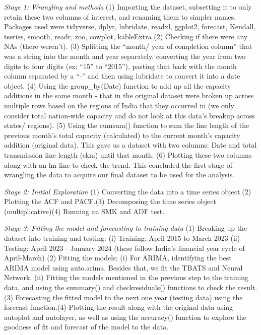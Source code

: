 \documentclass[
]{article}
\begin{document}
\emph{Stage 1: Wrangling and methods} \n (1) Importing the dataset,
subsetting it to only retain these two columns of interest, and renaming
them to simpler names. Packages used were tidyverse, dplyr, lubridate,
readxl, ggplot2, forecast, Kendall, tseries, smooth, readr, zoo,
cowplot, kableExtra \n (2) Checking if there were any NAs (there
weren't). \n (3) Splitting the ``month/ year of completion column'' that
was a string into the month and year separately, converting the year
from two digits to four digits (ex: ``15'' to ``2015''), pasting that
back with the month column separated by a ``-'' and then using lubridate
to convert it into a date object. \n (4) Using the group\_by(Date)
function to add up all the capacity additions in the same month - that
in the original dataset were broken up across multiple rows based on the
regions of India that they occurred in (we only consider total
nation-wide capacity and do not look at this data's breakup across
states/ regions). \n (5) Using the cumsum() function to sum the line
length of the previous month's total capacity (calculated) to the
current month's capacity addition \n (original data). This gave us a
dataset with two columns: Date and total transmission line length (ckm)
until that month. \n (6) Plotting these two columns along with an lm
line to check the trend. \n This concluded the first stage of wrangling
the data to acquire our final dataset to be used for the analysis.

\emph{Stage 2: Initial Exploration} \n (1) Converting the data into a
time series object.\n (2) Plotting the ACF and PACF.\n (3) Decomposing
the time series object (multiplicative)\n (4) Running an SMK and ADF
test.\n

\emph{Stage 3: Fitting the model and forecasting to training data} \n
(1) Breaking up the dataset into training and testing: \n (i) Training:
April 2015 to March 2023 \n (ii) Testing: April 2023 - January 2024 \n
(these follow India's financial year cycle of April-March) \n (2)
Fitting the models: \n (i) For ARIMA, identifying the best ARIMA model
using auto.arima. Besides that, we fit the TBATS and Neural Network.\n
(ii) Fitting the models mentioned in the previous step to the training
data, and using the summary() and checkresiduals() functions to check
the result. \n (3) Forecasting the fitted model to the next one year
(testing data) using the forecast function.\n (4) Plotting the result
along with the original data using autoplot and autolayer, as well as
using the accuracy() function to explore the goodness of fit and
forecast of the model to the data.\n
\end{document}
